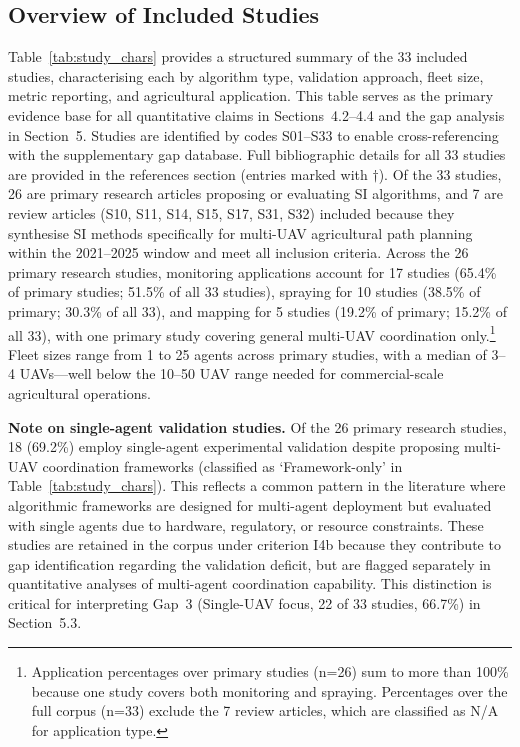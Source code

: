 \documentclass[review,3p,times]{elsarticle}
\begin{document}
\subsection{Overview of Included Studies}
Table~\ref{tab:study_chars} provides a structured summary of the 33 included studies, characterising each by algorithm type, validation approach, fleet size, metric reporting, and agricultural application. This table serves as the primary evidence base for all quantitative claims in Sections~4.2--4.4 and the gap analysis in Section~5. Studies are identified by codes S01--S33 to enable cross-referencing with the supplementary gap database. Full bibliographic details for all 33 studies are provided in the references section (entries marked with $\dagger$). Of the 33 studies, 26 are primary research articles proposing or evaluating SI algorithms, and 7 are review articles (S10, S11, S14, S15, S17, S31, S32) included because they synthesise SI methods specifically for multi-UAV agricultural path planning within the 2021--2025 window and meet all inclusion criteria. Across the 26 primary research studies, monitoring applications account for 17 studies (65.4\% of primary studies; 51.5\% of all 33 studies), spraying for 10 studies (38.5\% of primary; 30.3\% of all 33), and mapping for 5 studies (19.2\% of primary; 15.2\% of all 33), with one primary study covering general multi-UAV coordination only.\footnote{Application percentages over primary studies (n=26) sum to more than 100\% because one study covers both monitoring and spraying. Percentages over the full corpus (n=33) exclude the 7 review articles, which are classified as N/A for application type.} Fleet sizes range from 1 to 25 agents across primary studies, with a median of 3--4 UAVs---well below the 10--50 UAV range needed for commercial-scale agricultural operations.

\textbf{Note on single-agent validation studies.} Of the 26 primary research studies, 18 (69.2\%) employ single-agent experimental validation despite proposing multi-UAV coordination frameworks (classified as `Framework-only' in Table~\ref{tab:study_chars}). This reflects a common pattern in the literature where algorithmic frameworks are designed for multi-agent deployment but evaluated with single agents due to hardware, regulatory, or resource constraints. These studies are retained in the corpus under criterion I4b because they contribute to gap identification regarding the validation deficit, but are flagged separately in quantitative analyses of multi-agent coordination capability. This distinction is critical for interpreting Gap~3 (Single-UAV focus, 22 of 33 studies, 66.7\%) in Section~5.3.
\end{document}
